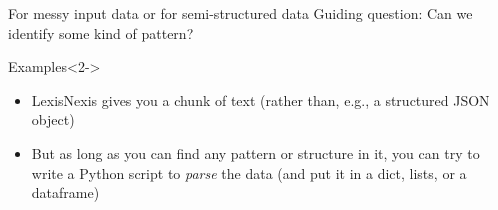 \documentclass[compress]{beamer}
\begin{document}
\begin{frame}{For messy input data or for semi-structured data}
	Guiding question: Can we identify some kind of pattern?
	\begin{block}{Examples}<2->
		\begin{itemize}
			\item<3-> LexisNexis gives you a chunk of text (rather than, e.g., a structured JSON object)
			\item<3-> But as long as you can find any pattern or structure in it, you can try to write a Python script to \emph{parse} the data (and put it in a dict, lists, or a dataframe)
		\end{itemize}
	\end{block}
\end{frame}

{
	\begin{frame}[plain]
	\end{frame}
	\begin{frame}[plain]
		\makebox[\linewidth]{
}
\end{frame}}
\end{document}
